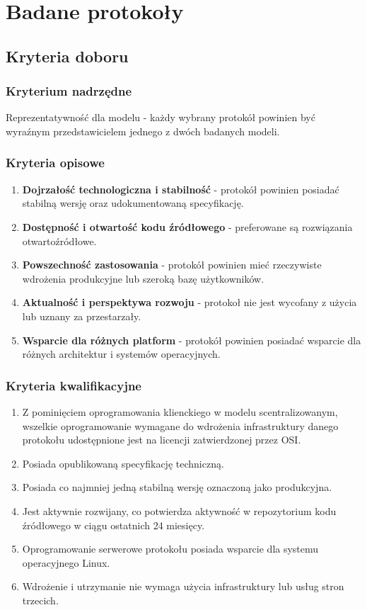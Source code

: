 \section{Badane protokoły}

\subsection{Kryteria doboru}

\subsubsection{Kryterium nadrzędne}
Reprezentatywność dla modelu - każdy wybrany protokół powinien być wyraźnym przedstawicielem jednego z dwóch badanych modeli.

\subsubsection{Kryteria opisowe}

\begin{enumerate}[leftmargin=*]
        \item \textbf{Dojrzałość technologiczna i stabilność} - protokół powinien posiadać stabilną wersję oraz udokumentowaną specyfikację.
        \item \textbf{Dostępność i otwartość kodu źródłowego} - preferowane są rozwiązania otwartoźródłowe.
    \item \textbf{Powszechność zastosowania} - protokół powinien mieć rzeczywiste wdrożenia produkcyjne lub szeroką bazę użytkowników.
    \item \textbf{Aktualność i perspektywa rozwoju} - protokoł nie jest wycofany z użycia lub uznany za przestarzały.
    \item \textbf{Wsparcie dla różnych platform} - protokół powinien posiadać wsparcie dla różnych architektur i systemów operacyjnych.
\end{enumerate}

\subsubsection{Kryteria kwalifikacyjne}
\begin{enumerate}[leftmargin=*]
    \item Z pominięciem oprogramowania klienckiego w modelu scentralizowanym, wszelkie oprogramowanie wymagane do wdrożenia infrastruktury danego protokołu udostępnione jest na licencji zatwierdzonej przez OSI. \cite{53EK}
    \item Posiada opublikowaną specyfikację techniczną.
    \item Posiada co najmniej jedną stabilną wersję oznaczoną jako produkcyjna.
    \item Jest aktywnie rozwijany, co potwierdza aktywność w repozytorium kodu źródłowego w ciągu ostatnich 24 miesięcy.
    \item Oprogramowanie serwerowe protokołu posiada wsparcie dla systemu operacyjnego Linux.
    \item Wdrożenie i utrzymanie nie wymaga użycia infrastruktury lub usług stron trzecich.
\end{enumerate}

